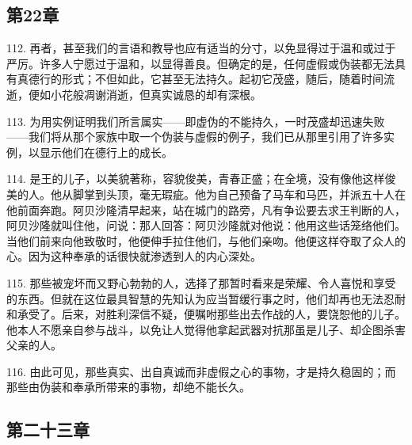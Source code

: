 \subsection{第22章}

\par

112. 再者，甚至我们的言语和教导也应有适当的分寸，以免显得过于温和或过于严厉。许多人宁愿过于温和，以显得善良。但确定的是，任何虚假或伪装都无法具有真德行的形式；不但如此，它甚至无法持久。起初它茂盛，随后，随着时间流逝，便如小花般凋谢消逝，但真实诚恳的却有深根。\par

113. 为用实例证明我们所言属实——即虚伪的不能持久，一时茂盛却迅速失败——我们将从那个家族中取一个伪装与虚假的例子，我们已从那里引用了许多实例，以显示他们在德行上的成长。\par

114. 是王的儿子，以美貌著称，容貌俊美，青春正盛；在全境，没有像他这样俊美的人。他从脚掌到头顶，毫无瑕疵。他为自己预备了马车和马匹，并派五十人在他前面奔跑。阿贝沙隆清早起来，站在城门的路旁，凡有争讼要去求王判断的人，阿贝沙隆就叫住他，问说：那人回答：阿贝沙隆就对他说：他用这些话笼络他们。当他们前来向他致敬时，他便伸手拉住他们，与他们亲吻。他便这样夺取了众人的心。因为这种奉承的话很快就渗透到人的内心深处。\par

115. 那些被宠坏而又野心勃勃的人，选择了那暂时看来是荣耀、令人喜悦和享受的东西。但就在这位最具智慧的先知认为应当暂缓行事之时，他们却再也无法忍耐和承受了。后来，对胜利深信不疑，便嘱咐那些出去作战的人，要饶恕他的儿子。他本人不愿亲自参与战斗，以免让人觉得他拿起武器对抗那虽是儿子、却企图杀害父亲的人。\par

116. 由此可见，那些真实、出自真诚而非虚假之心的事物，才是持久稳固的；而那些由伪装和奉承所带来的事物，却绝不能长久。\par


\subsection{第二十三章}

